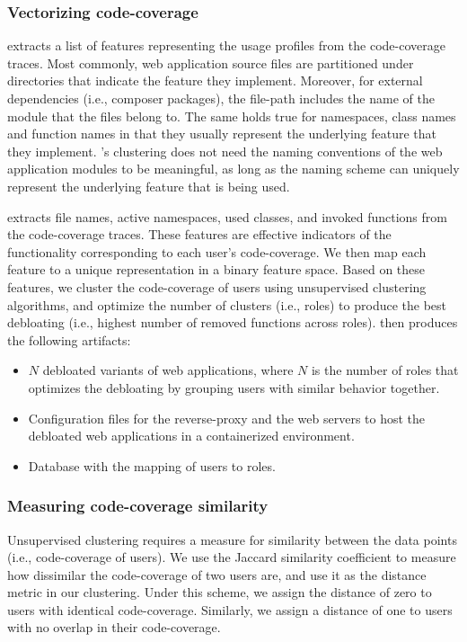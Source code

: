 \subsubsection{Vectorizing code-coverage} 
\dbltr{} extracts a list of features representing the usage profiles from the code-coverage traces. 
Most commonly, web application source files are partitioned under directories that indicate the feature they implement. 
Moreover, for external dependencies (i.e., composer packages), the file-path includes the name of the module that the files belong to. 
The same holds true for namespaces, class names and function names in that they usually represent the underlying feature that they implement. 
\dbltr{}'s clustering does not need the naming conventions of the web application modules to be meaningful, as long as the naming scheme can uniquely represent the underlying feature that is being used. 

\dbltr{} extracts file names, active namespaces, used classes, and invoked functions from the code-coverage traces.  
These features are effective indicators of the functionality corresponding to each user's code-coverage. 
We then map each feature to a unique representation in a binary feature space. 
Based on these features, we cluster the code-coverage of users using unsupervised clustering algorithms, and optimize the number of clusters (i.e., roles) to produce the best debloating (i.e., highest number of removed functions across roles). 
\dbltr{} then produces the following artifacts:

\begin{itemize}
    \item $N$ debloated variants of web applications, where $N$ is the number of roles that optimizes the debloating by grouping users with similar behavior together. 
    \item Configuration files for the reverse-proxy and the web servers to host the debloated web applications in a containerized environment. 
    \item Database with the mapping of users to roles.
\end{itemize}

\subsubsection{Measuring code-coverage similarity}
Unsupervised clustering requires a measure for similarity between the data points (i.e., code-coverage of users). 
We use the Jaccard similarity coefficient to measure how dissimilar the code-coverage of two users are, and use it as the distance metric in our clustering. 
Under this scheme, we assign the distance of zero to users with identical code-coverage. 
Similarly, we assign a distance of one to users with no overlap in their code-coverage. 

